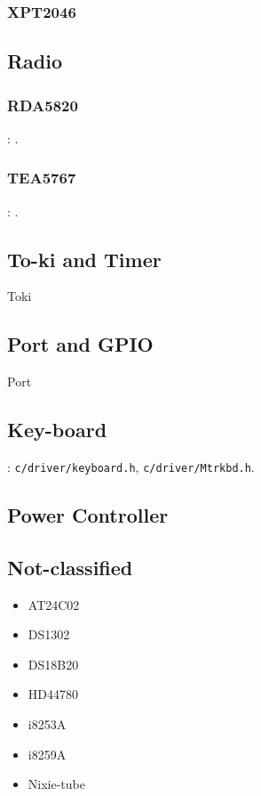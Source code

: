 \subsubsection{XPT2046}

\subsection{Radio}

\subsubsection{RDA5820}

: .

\subsubsection{TEA5767}

: .

\subsection{To-ki and Timer}
{Toki}

\subsection{Port and GPIO}
{Port}

\subsection{Key-board}
: \verb`c/driver/keyboard.h`, \verb`c/driver/Mtrkbd.h`.

\subsection{Power Controller}

\subsection{Not-classified}
\begin{itemize}
	\item AT24C02
	\item DS1302
	\item DS18B20
	\item HD44780
	\item i8253A
	\item i8259A
	\item Nixie-tube
\end{itemize}

